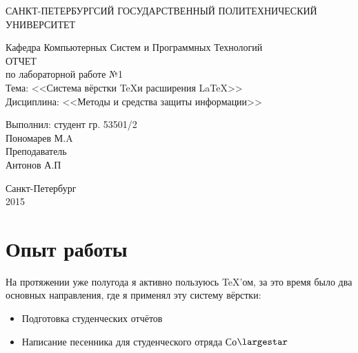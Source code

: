 \documentclass[utf8x, 12pt]{G7-32}
\begin{document}
\frontmatter 


\begin{center} 

\large САНКТ-ПЕТЕРБУРГСИЙ ГОСУДАРСТВЕННЫЙ ПОЛИТЕХНИЧЕСКИЙ УНИВЕРСИТЕТ

\large Кафедра Компьютерных Систем и Программных Технологий \\[5.5cm] 

\huge ОТЧЕТ \\[0.6cm] %
\large по лабораторной работе №1\\
\large Тема: <<Система вёрстки \TeX и расширения \LaTeX>>\\
\large Дисциплина: <<Методы и средства защиты информации>>\\[3.7cm]

\end{center} 

\begin{flushright}
Выполнил: студент гр. 53501/2 \\
Пономарев М.A \\[1.2cm]


Преподаватель \\
Антонов А.П
\end{flushright}


\vfill 

\begin{center} 
\large Санкт-Петербург \\
2015
\end{center} 

\thispagestyle{empty}



\thispagestyle{empty}
\setcounter{page}{0}
\tableofcontents
\clearpage
\mainmatter



\chapter{Опыт работы}

На протяжении уже полугода я активно пользуюсь \TeX 'ом, за это время было два основных направления, где я применял эту систему вёрстки:

\begin{itemize}
	\item Подготовка студенческих отчётов
	\item Написание песенника для студенческого отряда Со$\largestar$
\end{itemize}
\end{document}
